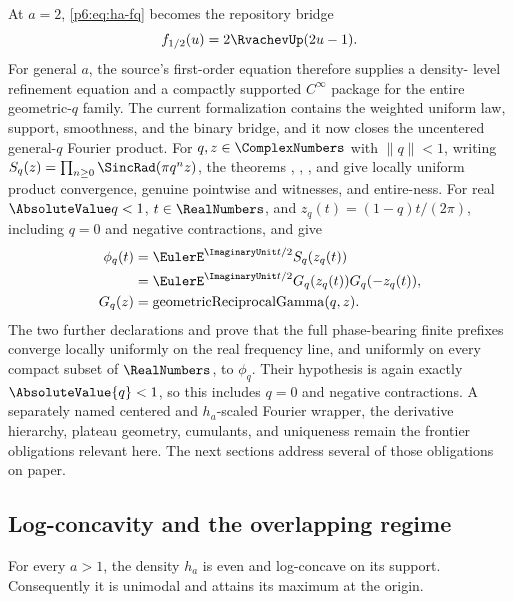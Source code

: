 \documentclass[11pt,oneside]{article}
\numberwithin{equation}{section}
\theoremstyle{definition}
\theoremstyle{remark}
\begin{document}
At $a=2$, \eqref{p6:eq:ha-fq} becomes the repository bridge
\[
 f_{1/2}(u)=2\RvachevUp(2u-1).
\]
For general $a$, the source's first-order equation therefore supplies a density-
level refinement equation and a compactly supported $C^\infty$ package for the
entire geometric-$q$ family.  The current formalization contains the weighted
uniform law, support, smoothness, and the binary bridge, and it now closes the
uncentered general-$q$ Fourier product.  For $q,z\in\ComplexNumbers$ with
$\lVert q\rVert<1$, writing
$S_q(z)=\prod_{n\ge0}\SincRad(\pi q^nz)$, the theorems
,
,
, and
 give locally uniform product
convergence, genuine pointwise  and  witnesses,
and entire-ness.  For real $\AbsoluteValue q<1$, $t\in\RealNumbers$, and
$z_q(t)=(1-q)t/(2\pi)$, including $q=0$ and negative contractions,
and
give
\[
\begin{aligned}
 \phi_q(t)
   &=\EulerE^{\ImaginaryUnit t/2}S_q(z_q(t)) \\
   &=\EulerE^{\ImaginaryUnit t/2}G_q(z_q(t))G_q(-z_q(t)), \\
 G_q(z)&=\operatorname{geometricReciprocalGamma}(q,z).
\end{aligned}
\]
The two further declarations
 and
 prove that the full
phase-bearing finite prefixes converge locally uniformly on the real
frequency line, and uniformly on every compact subset of \(\RealNumbers\), to
\(\phi_q\).  Their hypothesis is again exactly \(\AbsoluteValue{q}<1\), so this includes
\(q=0\) and negative contractions.
A separately named centered and $h_a$-scaled Fourier wrapper, the derivative
hierarchy, plateau geometry, cumulants, and uniqueness remain the frontier
obligations relevant here.  The next sections address several of those
obligations on paper.

\subsection{Log-concavity and the overlapping regime}

\begin{proposition}\label{p6:prop:log-concavity}
For every $a>1$, the density $h_a$ is even and log-concave on its support.
Consequently it is unimodal and attains its maximum at the origin.
\end{proposition}
\end{document}
